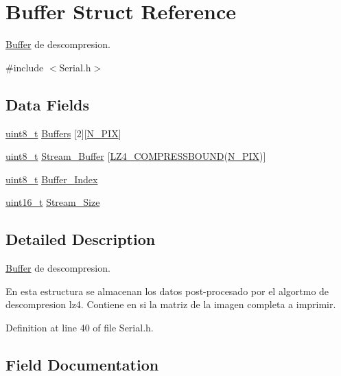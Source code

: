 \hypertarget{structBuffer}{}\section{Buffer Struct Reference}
\label{structBuffer}


\hyperlink{structBuffer}{Buffer} de descompresion.  




{\ttfamily \#include $<$Serial.\+h$>$}

\subsection*{Data Fields}
\begin{DoxyCompactItemize}
\item 
\hyperlink{RegsLPC1769_8h_aba7bc1797add20fe3efdf37ced1182c5}{uint8\+\_\+t} \hyperlink{structBuffer_aa46fd86a8467fd9c22e27aecd2ce5a6c}{Buffers} \mbox{[}2\mbox{]}\mbox{[}\hyperlink{Serial_8h_af6da69ccda8aa07b1fafe1db53bd4051}{N\+\_\+\+P\+IX}\mbox{]}
\item 
\hyperlink{RegsLPC1769_8h_aba7bc1797add20fe3efdf37ced1182c5}{uint8\+\_\+t} \hyperlink{structBuffer_a8f92727e7b44eade72f7770483f92e40}{Stream\+\_\+\+Buffer} \mbox{[}\hyperlink{lz4_8h_a2453a423fd34640a0afbbf57ed0a5399}{L\+Z4\+\_\+\+C\+O\+M\+P\+R\+E\+S\+S\+B\+O\+U\+ND}(\hyperlink{Serial_8h_af6da69ccda8aa07b1fafe1db53bd4051}{N\+\_\+\+P\+IX})\mbox{]}
\item 
\hyperlink{RegsLPC1769_8h_aba7bc1797add20fe3efdf37ced1182c5}{uint8\+\_\+t} \hyperlink{structBuffer_a4b7b77de63c2c7d070aed73400f06d61}{Buffer\+\_\+\+Index}
\item 
\hyperlink{RegsLPC1769_8h_a273cf69d639a59973b6019625df33e30}{uint16\+\_\+t} \hyperlink{structBuffer_ad2ce1666d61d13e70634895da5a90696}{Stream\+\_\+\+Size}
\end{DoxyCompactItemize}


\subsection{Detailed Description}
\hyperlink{structBuffer}{Buffer} de descompresion. 

En esta estructura se almacenan los datos post-\/procesado por el algortmo de descompresion lz4. Contiene en si la matriz de la imagen completa a imprimir. 

Definition at line 40 of file Serial.\+h.



\subsection{Field Documentation}
\mbox{\label{structBuffer_a4b7b77de63c2c7d070aed73400f06d61}} 
